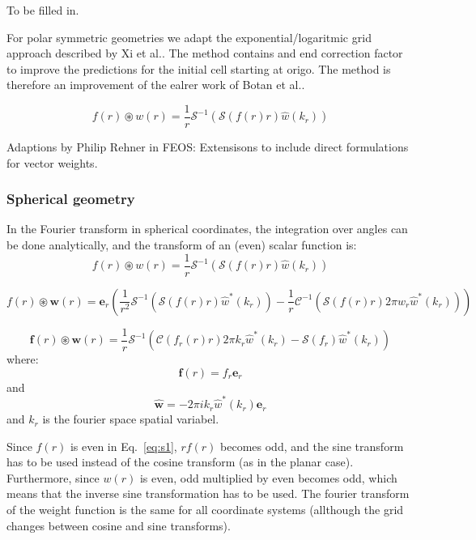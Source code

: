 \documentclass[12pt, letterpaper]{article}
\begin{document}
To be filled in.

For polar symmetric geometries we adapt the exponential/logaritmic
grid approach described by Xi et al.\cite{xi2020}. The method contains
and end correction factor to improve the predictions for the initial
cell starting at origo. The method is therefore an improvement of the
ealrer work of Botan et al.\cite{botan2009}.

\begin{equation}
  f(r)\circledast w(r) = \frac{1}{r}\mathscr{S}^{-1}\left(\mathscr{S}\left(f(r)r\right)\hat{w}(k_r)\right)
  \label{eq:s1}
\end{equation}


Adaptions by Philip Rehner in FEOS: Extensisons to include direct formulations for vector weights.

\subsubsection{Spherical geometry}
In the Fourier transform in spherical coordinates, the integration over angles can be done analytically, and the transform of an (even) scalar function is:
\begin{equation}
  f(r)\circledast w(r) = \frac{1}{r}\mathscr{S}^{-1}\left(\mathscr{S}\left(f(r)r\right)\hat{w}(k_r)\right)
  \label{eq:s1}
\end{equation}

\begin{equation}
  f(r)\circledast \mathbf{w}(r) = \mathbf{e}_r\left(\frac{1}{r^2}\mathscr{S}^{-1}\left(\mathscr{S}\left(f(r)r\right)\hat{w}^*(k_r)\right)-\frac{1}{r}\mathscr{C}^{-1}\left(\mathscr{S}\left(f(r)r\right)2\pi w_r\hat{w}^*(k_r)\right)\right)
   \label{eq:s2}
\end{equation}

\begin{equation}
  \mathbf{f}(r)\circledast \mathbf{w}(r) = \frac{1}{r}\mathscr{S}^{-1}\left(\mathscr{C}\left(f_r(r)r\right)2\pi k_r\hat{w}^*(k_r)-\mathscr{S}\left(f_r\right)\hat{w}^*(k_r)\right)
   \label{eq:s3}
\end{equation}
where:
\begin{equation}
\mathbf{f}(r)=f_r\mathbf{e}_r
\end{equation}
and
\begin{equation}
\hat{\mathbf{w}}=-2\pi i k_r\hat{w}^*(k_r)\mathbf{e}_r
\end{equation}
and $k_r$ is the fourier space spatial variabel.

Since $f(r)$ is even in Eq.~\ref{eq:s1}, $rf(r)$ becomes odd, and the sine transform has to be used instead of the cosine transform (as in the planar case). Furthermore, since $w(r)$ is even, odd multiplied by even becomes odd, which means that the inverse sine transformation has to be used. The fourier transform of the weight function is the same for all coordinate systems (allthough the grid changes between cosine and sine transforms).
\end{document}
